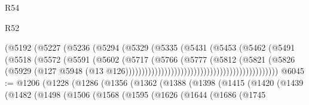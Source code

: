 \begin{lexlean}{R54}
\begin{lexlean}{R52}
\begin{coremodule}
{{{{{{{{{{{{{{{{{{{{{{{{{{{{{{{{{{{{{{{{{{{{{{{{{{{{{{{{{{{{{{{{{{{{{{{{{{{{{{{{{{{{{{{{{{{{{{{{{{{{{{{{{{{{{{{{{{{{{{{{{{{{{{{{{{{{{{{{{{{{{{{{{{{{{{{{{{{{{{{{{{{{{{{{{{{{{{{{{{{{{{{{{{{{{{{{{{{{{{                                                    (@5192
                                                      (@5227
                                                        (@5236
                                                          (@5294
                                                            (@5329
                                                              (@5335
                                                                (@5431
                                                                  (@5453
                                                                    (@5462
                                                                      (@5491
                                                                        (@5518
                                                                          (@5572
                                                                            (@5591
                                                                              (@5602
                                                                                (@5717
                                                                                  (@5766
                                                                                    (@5777
                                                                                      (@5812
                                                                                        (@5821
                                                                                          (@5826
                                                                                            (@5929
                                                                                              (@127
                                                                                                @5948
                                                                                                (@13
                                                                                                  @126)))))))))))))))))))))))))))))))))))))))))))))))
@6045 := @1206
    (@1228
      (@1286
        (@1356
          (@1362
            (@1388
              (@1398
                (@1415
                  (@1420
                    (@1439
                      (@1482
                        (@1498
                          (@1506
                            (@1568
                              (@1595
                                (@1626
                                  (@1644
                                    (@1686
                                      (@1745
}}}}}}}}}}}}}}}}}}}}}}}}}}}}}}}}}}}}}}}}}}}}}}}}}}}}}}}}}}}}}}}}}}}}}}}}}}}}}}}}}}}}}}}}}}}}}}}}}}}}}}}}}}}}}}}}}}}}}}}}}}}}}}}}}}}}}}}}}}}}}}}}}}}}}}}}}}}}}}}}}}}}}}}}}}}}}}}}}}}}}}}}}}}}}}}}}}}}}}
\end{coremodule}
\end{lexlean}
\end{lexlean}
